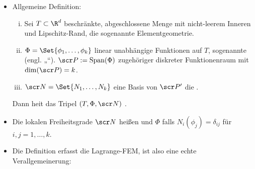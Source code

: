 \begin{note}[Verallgemeinerungen]
	\begin{itemize}
		\item
			Allgemeine Definition:
			\begin{enumerate}[(i)]
				\item
					Sei $T \subset \R^d$ beschränkte, abgeschlossene Menge mit nicht-leerem Inneren und Lipschitz-Rand, die sogenannte Elementgeometrie.
				\item
					$\Phi = \Set{\phi_1, \dotsc, \phi_k}$ linear unabhängige Funktionen auf $T$, sogenannte  (engl. „“).
					$\scr P := \Span (\Phi)$ zugehöriger diskreter Funktionenraum mit $\dim (\scr P) = k$.
				\item
					$\scr N = \Set{N_1, \dotsc, N_k}$ eine Basis von $\scr P'$ die .
			\end{enumerate}
			Dann heit das Tripel $(T, \Phi, \scr N)$ .
		\item
			Die lokalen Freiheitsgrade $\scr N$ heißen  und $\Phi$  falls $N_i(\phi_j) = \delta_{ij}$ für $i,j = 1, \dotsc, k$.
		\item
			Die Definition erfasst die Lagrange-FEM, ist also eine echte Verallgemeinerung:


\end{itemize}
\end{note}
